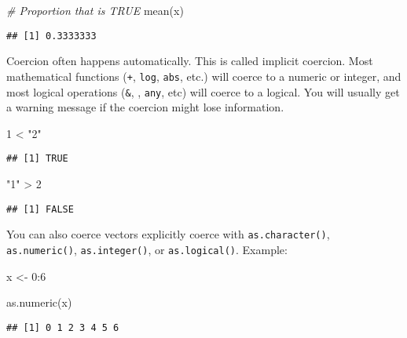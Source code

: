 \documentclass[
]{book}
\newenvironment{Shaded}{\begin{snugshade}}{\end{snugshade}}
\newcommand{\CommentTok}[1]{\textcolor[rgb]{0.56,0.35,0.01}{\textit{#1}}}
\newcommand{\DecValTok}[1]{\textcolor[rgb]{0.00,0.00,0.81}{#1}}
\newcommand{\FunctionTok}[1]{\textcolor[rgb]{0.00,0.00,0.00}{#1}}
\newcommand{\NormalTok}[1]{#1}
\newcommand{\OtherTok}[1]{\textcolor[rgb]{0.56,0.35,0.01}{#1}}
\newcommand{\SpecialCharTok}[1]{\textcolor[rgb]{0.00,0.00,0.00}{#1}}
\newcommand{\StringTok}[1]{\textcolor[rgb]{0.31,0.60,0.02}{#1}}
\begin{document}
\begin{Shaded}
\begin{Highlighting}[]
\CommentTok{\# Proportion that is TRUE}
\FunctionTok{mean}\NormalTok{(x)}
\end{Highlighting}
\end{Shaded}

\begin{verbatim}
## [1] 0.3333333
\end{verbatim}

Coercion often happens automatically. This is called implicit coercion. Most mathematical functions (\texttt{+}, \texttt{log}, \texttt{abs}, etc.) will coerce to a numeric or integer, and most logical operations (\texttt{\&}, \texttt{\textbar{}}, \texttt{any}, etc) will coerce to a logical. You will usually get a warning message if the coercion might lose information.

\begin{Shaded}
\begin{Highlighting}[]
\DecValTok{1} \SpecialCharTok{\textless{}} \StringTok{"2"}
\end{Highlighting}
\end{Shaded}

\begin{verbatim}
## [1] TRUE
\end{verbatim}

\begin{Shaded}
\begin{Highlighting}[]
\StringTok{"1"} \SpecialCharTok{\textgreater{}} \DecValTok{2}
\end{Highlighting}
\end{Shaded}

\begin{verbatim}
## [1] FALSE
\end{verbatim}

You can also coerce vectors explicitly coerce with \texttt{as.character()}, \texttt{as.numeric()}, \texttt{as.integer()}, or \texttt{as.logical()}. Example:

\begin{Shaded}
\begin{Highlighting}[]
\NormalTok{x }\OtherTok{\textless{}{-}} \DecValTok{0}\SpecialCharTok{:}\DecValTok{6}

\FunctionTok{as.numeric}\NormalTok{(x)}
\end{Highlighting}
\end{Shaded}

\begin{verbatim}
## [1] 0 1 2 3 4 5 6
\end{verbatim}
\end{document}
